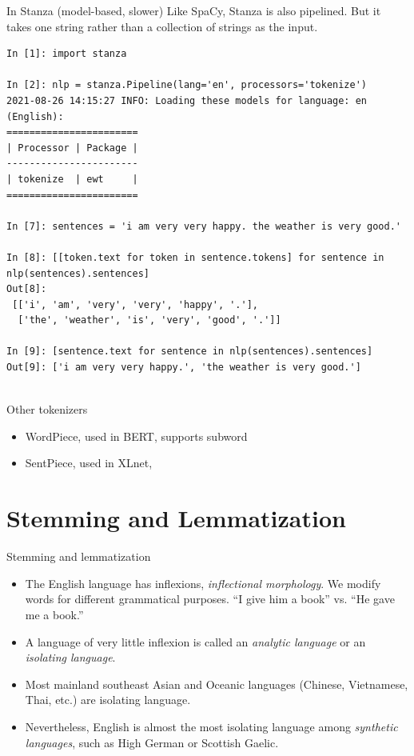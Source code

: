 \documentclass[11pt]{beamer}
\begin{document}
\begin{frame}[fragile]{In Stanza (model-based, slower)}
Like SpaCy, Stanza is also pipelined. But it takes one string rather than a collection of strings as  the input. 

\tiny
\begin{verbatim}
In [1]: import stanza

In [2]: nlp = stanza.Pipeline(lang='en', processors='tokenize')
2021-08-26 14:15:27 INFO: Loading these models for language: en (English):
=======================
| Processor | Package |
-----------------------
| tokenize  | ewt     |
=======================

In [7]: sentences = 'i am very very happy. the weather is very good.'

In [8]: [[token.text for token in sentence.tokens] for sentence in nlp(sentences).sentences]
Out[8]: 
 [['i', 'am', 'very', 'very', 'happy', '.'],
  ['the', 'weather', 'is', 'very', 'good', '.']]

In [9]: [sentence.text for sentence in nlp(sentences).sentences]
Out[9]: ['i am very very happy.', 'the weather is very good.']
    
\end{verbatim}  
\end{frame}

\begin{frame}{Other tokenizers}
  \begin{itemize}
    \item WordPiece, used in BERT, supports subword 
    \item SentPiece, used in XLnet, 
  \end{itemize}
  
\end{frame}

\section{Stemming and Lemmatization}

\begin{frame}{Stemming and lemmatization}
 \begin{itemize}[<+->]
  \item The English language has inflexions, \textit{inflectional morphology}. We modify words for different grammatical purposes. ``I give him a book'' vs. ``He gave me a book.'' 
  \item A language of very little inflexion is called an \textit{analytic language} or an \textit{isolating language}. 
  \item Most mainland southeast Asian and Oceanic languages (Chinese, Vietnamese, Thai, etc.) are isolating language. 
  \item Nevertheless, English is almost the most isolating language among \textit{synthetic languages}, such as High German or Scottish Gaelic. 
 \end{itemize}
\end{frame}
\end{document}
